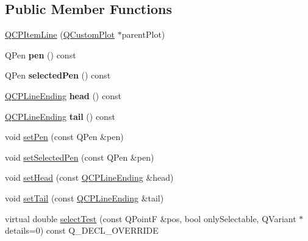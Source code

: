 \subsection*{Public Member Functions}
\begin{DoxyCompactItemize}
\item 
\hyperlink{class_q_c_p_item_line_a17804b7f64961c6accf25b61e85142e3}{Q\+C\+P\+Item\+Line} (\hyperlink{class_q_custom_plot}{Q\+Custom\+Plot} $\ast$parent\+Plot)
\item 
\mbox{\label{class_q_c_p_item_line_a712e5a7f59db3f4c588dfc370a63e225}} 
Q\+Pen {\bfseries pen} () const
\item 
\mbox{\label{class_q_c_p_item_line_ae1782c4fbecd38054ec3d49d8572a5e5}} 
Q\+Pen {\bfseries selected\+Pen} () const
\item 
\mbox{\label{class_q_c_p_item_line_a6cdc9e87e17418d4b0e66eaa0f041407}} 
\hyperlink{class_q_c_p_line_ending}{Q\+C\+P\+Line\+Ending} {\bfseries head} () const
\item 
\mbox{\label{class_q_c_p_item_line_ac085d3939ec11d7a4d592dc2ed578360}} 
\hyperlink{class_q_c_p_line_ending}{Q\+C\+P\+Line\+Ending} {\bfseries tail} () const
\item 
void \hyperlink{class_q_c_p_item_line_a572528dab61c1abe205822fbd5db4b27}{set\+Pen} (const Q\+Pen \&pen)
\item 
void \hyperlink{class_q_c_p_item_line_a3e2fec44503277e77717e9c24f87f1ea}{set\+Selected\+Pen} (const Q\+Pen \&pen)
\item 
void \hyperlink{class_q_c_p_item_line_aebf3d687114d584e0459db6759e2c3c3}{set\+Head} (const \hyperlink{class_q_c_p_line_ending}{Q\+C\+P\+Line\+Ending} \&head)
\item 
void \hyperlink{class_q_c_p_item_line_ac264222c3297a7efe33df9345c811a5f}{set\+Tail} (const \hyperlink{class_q_c_p_line_ending}{Q\+C\+P\+Line\+Ending} \&tail)
\item 
virtual double \hyperlink{class_q_c_p_item_line_a8e02bfbca04fbcf3dbc375a2bf693229}{select\+Test} (const Q\+PointF \&pos, bool only\+Selectable, Q\+Variant $\ast$details=0) const Q\+\_\+\+D\+E\+C\+L\+\_\+\+O\+V\+E\+R\+R\+I\+DE
\end{DoxyCompactItemize}
